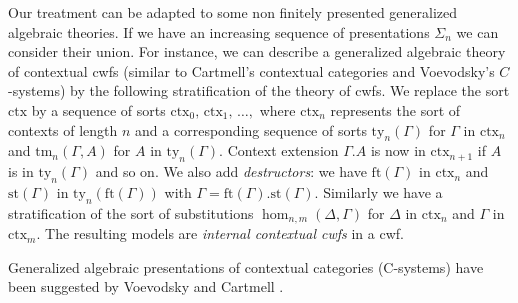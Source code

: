 \documentclass{lmcs}
\newcommand{\FYI}[1]{{\color{red}#1}}
\newcommand{\ctx}{\mathrm{ctx}}
\newcommand{\ty}{\mathrm{ty}}
\newcommand{\tm}{\mathrm{tm}}
\begin{document}
Our treatment can be adapted to some non finitely presented generalized algebraic theories.
If we have an increasing sequence of \FYI{presentations} $\Sigma_n$ we can consider their
union.
For instance, we can describe a generalized algebraic theory of contextual cwfs \cite{castellan:lambek} (similar to Cartmell's contextual categories and Voevodsky's $C$-systems) by
the following stratification of the theory of cwfs. We replace the sort $\ctx$
by a sequence of sorts $\ctx_0,\,\ctx_1,\,\dots ,$ where $\ctx_n$ represents the sort
of contexts of length $n$ and a corresponding sequence of sorts
$\ty_n(\Gamma)$ for $\Gamma$ in $\ctx_n$
and $\tm_n(\Gamma,A)$ for $A$ in $\ty_n(\Gamma)$. Context extension $\Gamma.A$ is now in $\ctx_{n+1}$
if $A$ is in $\ty_n(\Gamma)$ and so on.
We also add {\em destructors}: we have
$\mathrm{ft}(\Gamma)$ in $\ctx_n$
and $\mathrm{st}(\Gamma)$ in $\ty_n(\mathrm{ft}(\Gamma))$
with $\Gamma = \mathrm{ft}(\Gamma).\mathrm{st}(\Gamma)$.
Similarly we have a stratification of the sort of substitutions
$\hom_{n,m}(\Delta,\Gamma)$ for $\Delta$ in $\ctx_n$ and $\Gamma$ in $\ctx_m$.
The resulting models are {\em internal contextual cwfs} in a cwf.

\begin{remark}
Generalized algebraic presentations of contextual categories (C-systems) have been suggested by Voevodsky \cite{voevodsky:c-systems} and Cartmell \cite{cartmell:gat-contextual}.
\end{remark}


\end{document}
